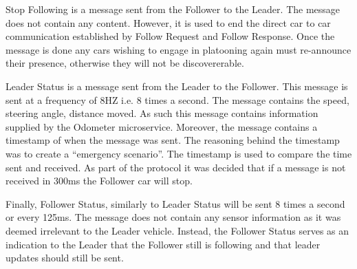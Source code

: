 \documentclass[12pt]{article}
\begin{document}
Stop Following is a message sent from the Follower to the Leader. The message does not contain any content. However, it is used to end the direct car to car communication established by Follow Request and Follow Response. Once the message is done any cars wishing to engage in platooning again must re-announce their presence, otherwise they will not be discovererable. \par

Leader Status is a message sent from the Leader to the Follower. This message is sent at a frequency of 8HZ i.e. 8 times a second. The message contains the speed, steering angle, distance moved. As such this message contains information supplied by the Odometer microservice. Moreover, the message contains a timestamp of when the message was sent. The reasoning behind the timestamp was to create a “emergency scenario”. The timestamp is used to compare the time sent and received. As part of the protocol it was decided that if a message is not received in 300ms the Follower car will stop. \par

Finally, Follower Status, similarly to Leader Status will be sent 8 times a second or every 125ms. The message does not contain any sensor information as it was deemed irrelevant to the Leader vehicle. Instead, the Follower Status serves as an indication to the Leader that the Follower still is following and that leader updates should still be sent. \par
\end{document}
